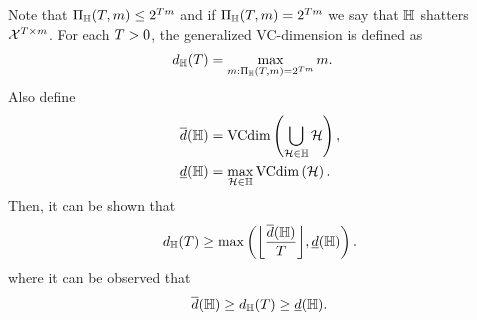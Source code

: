 \begin{definition}
Note that $\Pi_{\mathbb{H}}(T, m) \leq 2^{T m}$ and if $\Pi_{\mathbb{H}}(T, m) = 2^{T m}$ we say that $\mathbb{H}$ shatters $\mathcal{X}^{T \times m}$.
For each $T > 0$, the generalized VC-dimension is defined as
\begin{align}
    d_{\mathbb{H}}(T) &= \max_{m: \Pi_{\mathbb{H}}(T, m) = 2^{T m}} m . \nonumber 
\end{align}
Also define
\begin{align}
    \overline{d}(\mathbb{H}) &= \text{VCdim}\left(\bigcup_{\mathcal{H} \in \mathbb{H}} \mathcal{H}\right)  ,  \nonumber 
    \\
    \underline{d}(\mathbb{H}) &= \max_{\mathcal{H} \in \mathbb{H}} \text{VCdim}\left(\mathcal{H}\right)  . \nonumber
\end{align}
Then, it can be shown that
\begin{equation}
    \nonumber
    d_\hypspacef(\ntasks) \geq \max\left(\floor*{\frac{\overline{d}(\hypspacef)}{\ntasks}}, \underline{d}(\hypspacef) \right) .
\end{equation}
where it can be observed that 
\begin{equation}
    \label{eq:genvc_inequalities}
    \overline{d}(\hypspacef) \geq  d_\hypspacef(\ntasks)\geq \underline{d}(\hypspacef).
\end{equation}

\end{definition}
